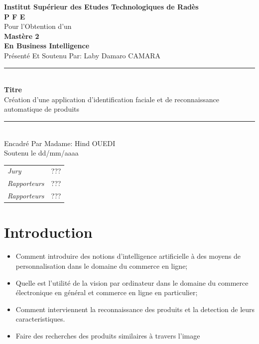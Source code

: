 \documentclass[12pt,a4paper,article]{memoir} %
\title{}
\author{}
\date{} %
\begin{document}
	
	   \begin{center}
	 	    \textbf{Institut Supérieur des  Etudes Technologiques de Radès}\\\vfill
		    \huge \textbf{P F E} \normalsize \\\vfill
		    Pour l'Obtention d'un\\
	           \Large \textbf{Mastère 2}\\
		    \LARGE \textbf{En Business Intelligence}\\ \normalsize\vfill
		    Présenté Et Soutenu Par:  \Large Laby Damaro CAMARA \normalsize\\\vfill
	          \rule{0.95\textwidth}{1.5pt}\\ \vspace{\baselineskip}
		    \Large \textbf{Titre} \normalsize \\\vfill
		    Création d’une application d’identification faciale et de reconnaissance automatique de produits\\
		   \rule{0.95\textwidth}{1.5pt}\\ \vspace{0.9\baselineskip}\vfill
		    Encadré Par Madame: \Large Hind OUEDI\normalsize\\
		    Soutenu le dd/mm/aaaa\\\vfill
	          \begin{tabular}{ll}
	                 \hline\hline
				    \emph{Jury} & ???\\
				    \emph{Rapporteurs} & ???\\
			          \emph{Rapporteurs} & ???\\
	                \hline\hline
	          \end{tabular}
	   \end{center}
\maketitle
\tableofcontents* %

     \newpage
	\chapter{Introduction}
		\begin{itemize}[label=$\star$]
			\item Comment introduire des notions d'intelligence artificielle à des moyens de personnalisation dans le domaine du commerce en ligne;
			\item Quelle est l'utilité de la vision par ordinateur dans le domaine du commerce électronique en général et commerce en ligne en particulier;
			\item Comment interviennent la reconnaissance des produits et la detection de leurs caracteristiques.
	             \item Faire des recherches des produits similaires à travers l'image
		\end{itemize}
\end{document}

